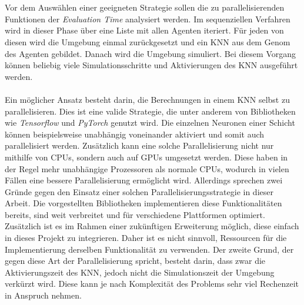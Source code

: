 \\\\
Vor dem Auswählen einer geeigneten Strategie sollen die zu parallelisierenden Funktionen der \emph{Evaluation Time} analysiert werden. Im sequenziellen Verfahren wird in dieser Phase über eine Liste mit allen Agenten iteriert. Für jeden von diesen wird die Umgebung einmal zurückgesetzt und ein \ac{KNN} aus dem Genom des Agenten gebildet. Danach wird die Umgebung simuliert. Bei diesem Vorgang können beliebig viele Simulationsschritte und Aktivierungen des \ac{KNN} ausgeführt werden. 
\\\\
Ein möglicher Ansatz besteht darin, die Berechnungen in einem \ac{KNN} selbst zu parallelisieren. Dies ist eine valide Strategie, die unter anderem von Bibliotheken wie \emph{Tensorflow} und \emph{PyTorch} genutzt wird. Die einzelnen Neuronen einer Schicht können beispielsweise unabhängig voneinander aktiviert und somit auch parallelisiert werden. Zusätzlich kann eine solche Parallelisierung nicht nur mithilfe von \acp{CPU}, sondern auch auf \acp{GPU} umgesetzt werden. Diese haben in der Regel mehr unabhängige Prozessoren als normale \acp{CPU}, wodurch in vielen Fällen eine bessere Parallelisierung ermöglicht wird. Allerdings sprechen zwei Gründe gegen den Einsatz einer solchen Parallelisierungsstrategie in dieser Arbeit. Die vorgestellten Bibliotheken implementieren diese Funktionalitäten bereits, sind weit verbreitet und für verschiedene Plattformen optimiert. Zusätzlich ist es im Rahmen einer zukünftigen Erweiterung möglich, diese einfach in dieses Projekt zu integrieren. Daher ist es nicht sinnvoll, Ressourcen für die Implementierung derselben Funktionalität zu verwenden. Der zweite Grund, der gegen diese Art der Parallelisierung spricht, besteht darin, dass zwar die Aktivierungszeit des \ac{KNN}, jedoch nicht die Simulationszeit der Umgebung verkürzt wird. Diese kann je nach Komplexität des Problems sehr viel Rechenzeit in Anspruch nehmen. 
\\\\
